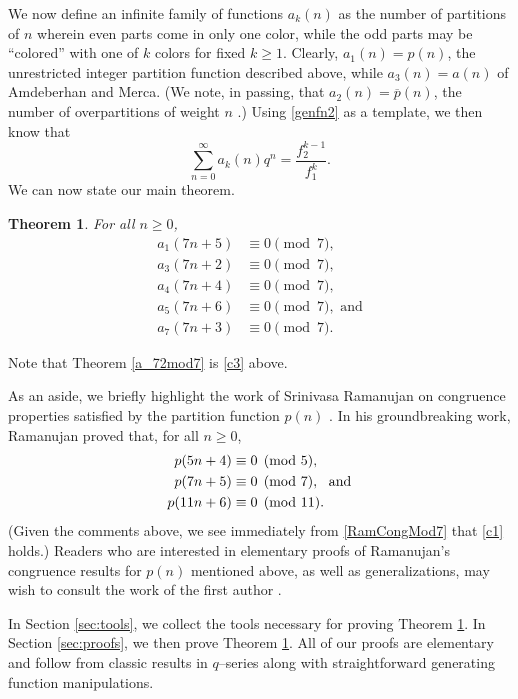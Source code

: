 \documentclass[10pt, reqno]{amsart}
\theoremstyle{theorem}
\newtheorem{theorem}{Theorem}[section]
\theoremstyle{definition}
\theoremstyle{example}
\begin{document}
We now define an infinite family of functions $a_k(n)$ as the number of partitions of $n$ wherein even parts come in only one color, while the odd parts may be ``colored'' with one of $k$ colors for fixed $k\geq 1$.    Clearly, $a_1(n) = p(n)$, the unrestricted integer partition function described above, while $a_3(n) = a(n)$ of Amdeberhan and Merca.  
(We note, in passing, that $a_2(n) = \overline{p}(n)$, the number of overpartitions of weight $n$ \cite{CL, HS05}.)
Using \eqref{genfn2} as a template, we then know that 
\begin{equation}
\label{genfn_general}
\sum_{n=0}^\infty a_k(n)q^n = \frac{f_2^{k-1}}{f_1^k}.
\end{equation}
We can now state our main theorem.
\begin{theorem}
\label{thm:main} 
For all $n\geq 0$, 
\begin{align}
a_{1}(7n+5) & \equiv 0 \pmod{7}, \label{c1} \\
a_{3}(7n+2) & \equiv 0 \pmod{7}, \label{c3} \\
a_{4}(7n+4) & \equiv 0 \pmod{7}, \label{c4} \\
a_{5}(7n+6) & \equiv 0 \pmod{7}, \label{c5} \text{\ \ and}\\
a_{7}(7n+3) & \equiv 0 \pmod{7}. \label{c7} 
\end{align}
\end{theorem}
\noindent 
Note that Theorem \ref{a_72mod7} is \eqref{c3} above.  

As an aside, we briefly highlight the work of Srinivasa Ramanujan on congruence properties satisfied by the partition function $p(n)$ \cite{Ram1919}.  In his groundbreaking work, Ramanujan proved that, for all $n\geq 0$, 
\begin{align}
p(5n+4) &\equiv 0 \pmod{5}, \notag\\
p(7n+5) &\equiv 0 \pmod{7}, \text{\ \ and} \label{RamCongMod7}\\
p(11n+6) &\equiv 0 \pmod{11}.  \notag
\end{align}
(Given the comments above, we see immediately from \eqref{RamCongMod7} that \eqref{c1} holds.)
Readers who are interested in elementary proofs of Ramanujan's congruence results for $p(n)$ mentioned above, as well as generalizations, may wish to consult the work of the first author \cite{Hir}.  


In Section \ref{sec:tools}, we collect the tools necessary for proving Theorem \ref{thm:main}.  In Section \ref{sec:proofs}, we then prove Theorem \ref{thm:main}.  All of our proofs are elementary and follow from classic results in $q$--series along with straightforward generating function manipulations.  
\end{document}
